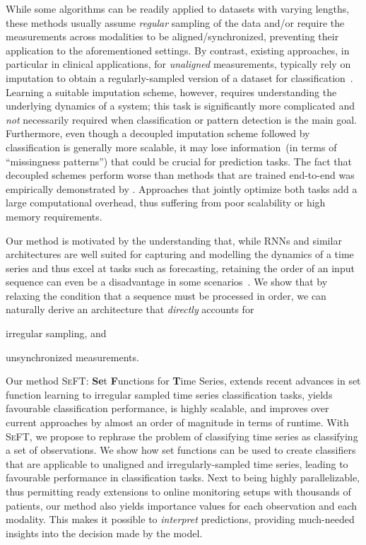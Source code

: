 \documentclass{article}
\newcommand{\methodname}     {\textsc{SeFT}\xspace}
\newcommand{\methodnamelong} {\textbf{Se}t \textbf{F}unctions for \textbf{T}ime
Series\xspace}
\begin{document}
While some algorithms can be readily applied to datasets with varying
lengths, these methods usually assume \emph{regular} sampling of the data and/or
require the measurements across modalities to be aligned/synchronized,
preventing their application to the aforementioned settings.
By contrast, existing approaches, in particular in clinical applications, for
\emph{unaligned} measurements, typically rely on imputation
to obtain a regularly-sampled version of a dataset for
classification~\citep{desautels2016prediction, Moor19}.
Learning a suitable imputation scheme, however, requires understanding the
underlying dynamics of a system; this task is significantly more complicated
and \emph{not} necessarily required when classification or pattern
detection is the main goal.
Furthermore, even though a decoupled imputation scheme followed by
classification is generally more scalable, it may lose information~(in
terms of ``missingness patterns'') that could be crucial for prediction
tasks.
The fact that decoupled schemes perform worse than methods
that are trained end-to-end was empirically
demonstrated by \citet{li2016scalable}.
Approaches that jointly optimize both tasks add a large
computational overhead, thus suffering from poor scalability or high
memory requirements.

Our method is motivated by the understanding that, while RNNs and
similar architectures are well suited for capturing and modelling the
dynamics of a time series and thus excel at tasks such as forecasting,
retaining the order of an input sequence can even be a disadvantage in
some scenarios~\citep{vinyals2015order}.
We show that by relaxing the condition that a sequence must be processed
in order, we can naturally derive an architecture that \emph{directly}
accounts for
\begin{inparaenum}[(i)]
  \item irregular sampling, and
  \item unsynchronized measurements.
\end{inparaenum}
Our method \methodname: \methodnamelong, extends recent advances in set
function learning to irregular sampled time series classification tasks,
yields favourable classification performance, is highly scalable, and improves
over current approaches by almost an order of magnitude in terms of
runtime.
With \methodname, we propose to rephrase the problem of classifying time
series as classifying a set of observations. We show how set
functions can be used to create classifiers that are applicable
to unaligned and irregularly-sampled time series, leading to favourable
performance in classification tasks. Next to being highly
parallelizable, thus permitting ready extensions to online monitoring
setups with thousands of patients, our method also yields
importance values for each observation and each modality.  This makes it
possible to \emph{interpret} predictions, providing much-needed
insights into the decision made by the model.
\end{document}
